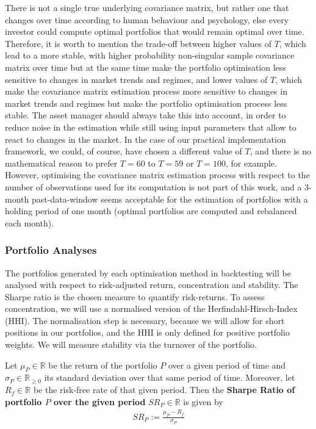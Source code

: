 		There is not a single true underlying covariance matrix, but rather one that changes over time according to human behaviour and psychology, else every investor could compute optimal portfolios that would remain optimal over time. Therefore, it is worth to mention the trade-off between higher values of $T$, which lead to a more stable, with higher probability non-singular sample covariance matrix over time but at the same time make the portfolio optimisation less sensitive to changes in market trends and regimes, and lower values of $T$, which make the covariance matrix estimation process more sensitive to changes in market trends and regimes but make the portfolio optimisation process less stable. The asset manager should always take this into account, in order to reduce noise in the estimation while still using input parameters that allow to react to changes in the market. In the case of our practical implementation framework, we could, of course, have chosen a different value of $T$, and there is no mathematical reason to prefer $T=60$ to $T=59$ or $T=100$, for example. However, optimising the covariance matrix estimation process with respect to the number of observations used for its computation is not part of this work, and a 3-month past-data-window seems acceptable for the estimation of portfolios with a holding period of one month (optimal portfolios are computed and rebalanced each month).
    
    \subsubsection{Portfolio Analyses}
        
        
        The portfolios generated by each optimisation method in backtesting will be analysed with respect to risk-adjusted return, concentration and stability. The Sharpe ratio is the chosen measure to quantify risk-returns. To assess concentration, we will use a normalised version of the Herfindahl-Hirsch-Index (HHI). The normalisation step is necessary, because we will allow for short positions in our portfolios, and the HHI is only defined for positive portfolio weights. We will measure stability via the turnover of the portfolio.
        
        \begin{definition} %
            Let $\mu_P \in \mathbb{R}$ be the return of the portfolio $P$ over a given period of time and $\sigma_P \in \mathbb{R}_{\geq 0}$ its standard deviation over that same period of time. Moreover, let $R_f \in \mathbb{R}$ be the risk-free rate of that given period. Then the \textbf{Sharpe Ratio of portfolio $P$ over the given period} $SR_P \in \mathbb{R}$ is given by
            \begin{align*}
                SR_P := \frac{\mu_P - R_f}{\sigma_P}
            \end{align*}
        \end{definition}
        
